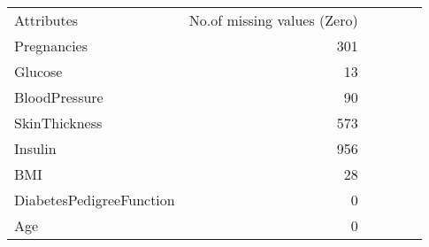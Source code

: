 \begin{tabular}{lrrrrr}
Attributes & No.of missing values (Zero) \\
Pregnancies & 301 \\
Glucose & 13 \\
BloodPressure & 90 \\
SkinThickness & 573 \\
Insulin & 956 \\
BMI & 28 \\
DiabetesPedigreeFunction & 0 \\
Age & 0 \\
\end{tabular}


